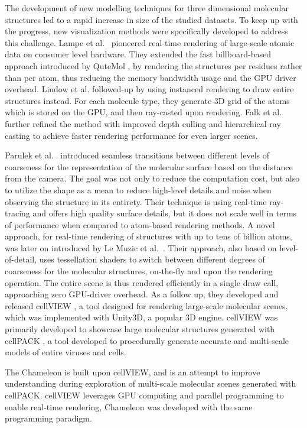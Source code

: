 \documentclass[review,journal]{vgtc}         %
\begin{document}
	The development of new modelling techniques for three dimensional molecular structures led to a rapid increase in size of the studied datasets.
	To keep up with the progress, new visualization methods were specifically developed to address this challenge.
	Lampe et al.~\cite{lampe2007two} pioneered real-time rendering of large-scale atomic data on consumer level hardware. 
	They extended the fast billboard-based approach introduced by QuteMol \cite{tarini2006ambient}, by rendering the structures per residues rather than per atom, thus reducing the memory bandwidth usage and the GPU driver overhead. 
	Lindow et al. \cite{lindow2012interactive} followed-up by using  instanced rendering to draw entire structures instead.
	For each molecule type, they generate 3D grid of the atoms which is stored on the GPU, and then ray-casted upon rendering.
	Falk et al. \cite{falk2013atomistic} further refined the method with improved depth culling and hierarchical ray casting to achieve faster rendering performance for even larger scenes. 
	
	Parulek et al.~\cite{parulek2014continuous} introduced seamless transitions between different levels of coarseness for the representation of the molecular surface based on the distance from the camera.
	The goal was not only to reduce the computation cost, but also to utilize the shape as a mean to reduce high-level details and noise when observing the structure in its entirety.
	Their technique is using real-time ray-tracing and offers high quality surface details, but it does not scale well in terms of performance when compared to atom-based rendering methods.
	A novel approach, for real-time rendering of structures with up to tens of billion atoms, was later on introduced by Le Muzic et al.~\cite{le2014illustrative}. 
	Their approach, also based on level-of-detail, uses tessellation shaders to switch between different degrees of coarseness for the molecular structures, on-the-fly and upon the rendering operation.
	The entire scene is thus rendered efficiently in a single draw call, approaching zero GPU-driver overhead. 
	As a follow up, they developed and released cellVIEW \cite{muzic2015cellview}, a tool designed for rendering large-scale molecular scenes, which was implemented with Unity3D, a popular 3D engine.
	cellVIEW was primarily developed to showcase large molecular structures generated with cellPACK \cite{johnson2015cellpack}, a tool developed to procedurally generate accurate and multi-scale models of entire viruses and cells.
	
	The Chameleon is built upon cellVIEW, and is an attempt to improve understanding during exploration of multi-scale molecular scenes generated with cellPACK.
	cellVIEW leverages GPU computing and parallel programming to enable real-time rendering, Chameleon was developed with the same programming paradigm.
	
\end{document}
